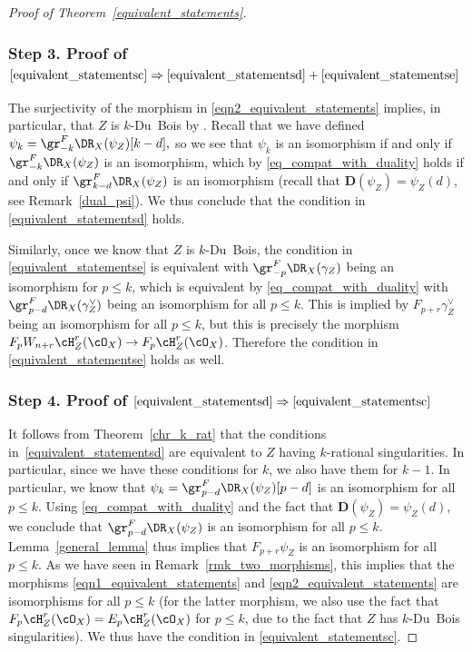 \begin{proof}[Proof of Theorem~\ref{equivalent_statements}]
\subsubsection*{Step 3. Proof of $\eqref{equivalent_statementsc}\Rightarrow\eqref{equivalent_statementsd}+\eqref{equivalent_statementse}$}
The surjectivity of the morphism in
\eqref{eqn2_equivalent_statements} implies, in particular, that $Z$ is $k$-Du~Bois by \cite[Th.\,F]{MP1}.
Recall that we have defined $\psi_k=\gr^F_{-k}\DR_X(\psi_Z)[k-d],$ so we see that $\psi_k$ is an isomorphism if and only if
$\gr^F_{-k}\DR_X(\psi_Z)$ is an isomorphism, which by \eqref{eq_compat_with_duality} holds if
and only if $\gr^F_{k-d}\DR_X(\psi_Z)$ is an isomorphism (recall that ${\mathbf D}(\psi_Z)=\psi_Z(d)$, see Remark~\ref{dual_psi}).
We thus conclude that the condition in \eqref{equivalent_statementsd} holds.

Similarly, once we know that $Z$ is $k$-Du~Bois, the condition in \eqref{equivalent_statementse} is equivalent with $\gr^F_{-p}\DR_X(\gamma_Z)$ being
an isomorphism for $p\leq k$, which is equivalent by \eqref{eq_compat_with_duality} with $\gr^F_{p-d}\DR_X(\gamma_Z^{\vee})$
being an isomorphism for all $p\leq k$. This is implied by $F_{p+r}\gamma_Z^{\vee}$ being an isomorphism for all $p\leq k$, but this is precisely
the morphism $F_pW_{n+r}\cH^r_Z(\cO_X)\to F_p\cH^r_Z(\cO_X)$. Therefore the condition in \eqref{equivalent_statementse} holds as well.

\subsubsection*{Step 4. Proof of $\eqref{equivalent_statementsd}\Rightarrow\eqref{equivalent_statementsc}$}
It follows from Theorem~\ref{chr_k_rat} that the conditions in~\eqref{equivalent_statementsd} are equivalent to $Z$ having $k$-rational singularities. In particular,
since we have these conditions for $k$, we also have them for $k-1$. In particular, we know that
$\psi_k=\gr^F_{p-d}\DR_X(\psi_Z)[p-d]$ is an isomorphism for all $p\leq k$. Using \eqref{eq_compat_with_duality} and the fact that
${\mathbf D}(\psi_Z)=\psi_Z(d)$, we conclude that $\gr^F_{p-d}\DR_X(\psi_Z)$ is an isomorphism for all $p\leq k$.
Lemma~\ref{general_lemma} thus implies that $F_{p+r}\psi_Z$ is an isomorphism for all $p\leq k$. As we have seen in
Remark~\ref{rmk_two_morphisms}, this implies that the morphisms \eqref{eqn1_equivalent_statements} and \eqref{eqn2_equivalent_statements}
are isomorphisms for all $p\leq k$ (for the latter morphism, we also use the fact that $F_p\cH_Z^r(\cO_X)=E_p\cH^r_Z(\cO_X)$ for $p\leq k$,
due to the fact that $Z$ has $k$-Du~Bois singularities). We thus have the condition in \eqref{equivalent_statementsc}.


\end{proof}
